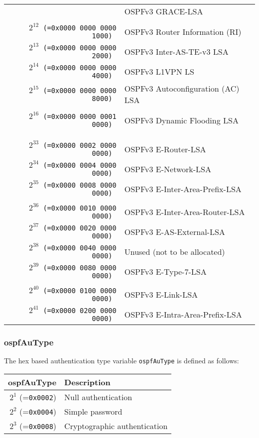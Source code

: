 \documentclass[documentation]{subfiles}
\begin{document}
\begin{longtable}{>{\tt}rl}
                                      & OSPFv3 GRACE-LSA\\
    \\
    $2^{12}$ (=0x0000 0000 0000 1000) & OSPFv3 Router Information (RI)\\
    $2^{13}$ (=0x0000 0000 0000 2000) & OSPFv3 Inter-AS-TE-v3 LSA\\
    $2^{14}$ (=0x0000 0000 0000 4000) & OSPFv3 L1VPN LS\\
    $2^{15}$ (=0x0000 0000 0000 8000) & OSPFv3 Autoconfiguration (AC) LSA\\
    \\
    $2^{16}$ (=0x0000 0000 0001 0000) & OSPFv3 Dynamic Flooding LSA\\
    \\
    \multicolumn{2}{l}{$2^{17}$--$2^{32}$ are unassigned}\\
    \\
    $2^{33}$ (=0x0000 0002 0000 0000) & OSPFv3 E-Router-LSA\\
    $2^{34}$ (=0x0000 0004 0000 0000) & OSPFv3 E-Network-LSA\\
    $2^{35}$ (=0x0000 0008 0000 0000) & OSPFv3 E-Inter-Area-Prefix-LSA\\
    \\
    $2^{36}$ (=0x0000 0010 0000 0000) & OSPFv3 E-Inter-Area-Router-LSA\\
    $2^{37}$ (=0x0000 0020 0000 0000) & OSPFv3 E-AS-External-LSA\\
    $2^{38}$ (=0x0000 0040 0000 0000) & Unused (not to be allocated)\\
    $2^{39}$ (=0x0000 0080 0000 0000) & OSPFv3 E-Type-7-LSA\\
    \\
    $2^{40}$ (=0x0000 0100 0000 0000) & OSPFv3 E-Link-LSA\\
    $2^{41}$ (=0x0000 0200 0000 0000) & OSPFv3 E-Intra-Area-Prefix-LSA\\
    \bottomrule
\end{longtable}

\subsubsection{ospfAuType}\label{ospfAuType}
The hex based authentication type variable {\tt ospfAuType} is defined as follows:
\begin{longtable}{rl}
    \toprule
    {\bf ospfAuType}      & {\bf Description} \\
    \midrule\endhead%
    $2^1$ (={\tt 0x0002}) & Null authentication\\
    $2^2$ (={\tt 0x0004}) & Simple password\\
    $2^3$ (={\tt 0x0008}) & Cryptographic authentication\\
    \bottomrule
\end{longtable}
\end{document}
